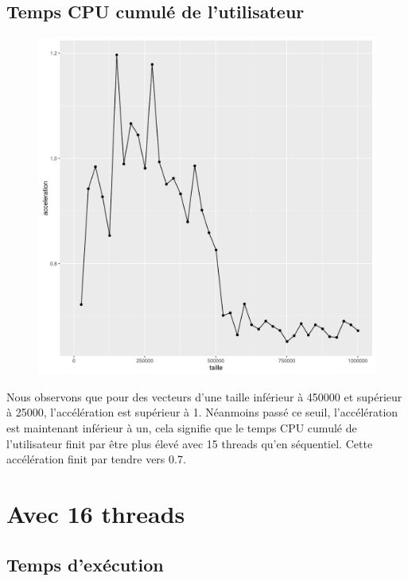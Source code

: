 \documentclass[a4paper,11pt]{scrartcl}
\begin{document}
\subsection{Temps CPU cumul\'e de l'utilisateur}
\begin{figure}[H] \center
   \includegraphics[scale=0.5] {graphes/temps_user_accel15.png}
\end{figure}
Nous observons que pour des vecteurs d'une taille inf\'erieur \`a 450000 et sup\'erieur \`a 25000, l'acc\'el\'eration est sup\'erieur \`a 1. N\'eanmoins pass\'e ce seuil,  l'acc\'el\'eration est maintenant inf\'erieur \`a un, cela signifie que le temps CPU cumul\'e de l'utilisateur finit par \^{e}tre plus \'elev\'e avec 15 threads qu'en s\'equentiel. Cette acc\'el\'eration finit par tendre vers 0.7.


\section{Avec 16 threads}
\subsection{Temps d'ex\'ecution}
\end{document}
